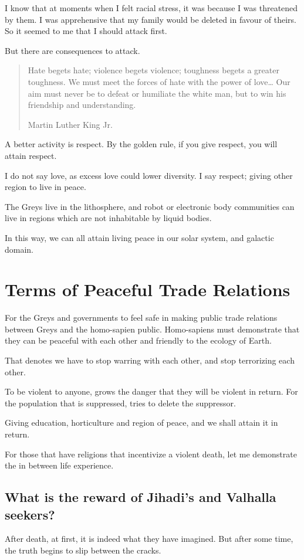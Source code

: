 I know that at moments when I felt racial stress, it was because I was
threatened by them. I was apprehensive that my family would be deleted in favour
of theirs. So it seemed to me that I should attack first. 

But there are consequences to attack.

\blockquote[Martin Luther King Jr.]{Hate begets hate; violence begets violence; 
toughness begets a greater toughness. We must meet the forces of hate with the 
power of love\ldots{} Our aim must never be to defeat or humiliate the white 
man, but to win his friendship and understanding.}

A better activity is respect. By the golden rule, if you give respect, you will
attain respect. 

I do not say love, as excess love could lower diversity. 
I say respect; giving other region to live in peace. 

The Greys live in the lithosphere, and robot or electronic body communities 
can live in regions which are not inhabitable by liquid bodies.

In this way, we can all attain living peace in our solar system, 
and galactic domain.

\section{Terms of Peaceful Trade Relations}\label{terms}

For the Greys and governments to feel safe in making public trade relations
between Greys and the homo-sapien public.
Homo-sapiens must demonstrate that they can be peaceful with each other and
friendly to the ecology of Earth.

That denotes we have to stop warring with each other,
and stop terrorizing each other.

To be violent to anyone, grows the danger that they will be violent in return.
For the population that is suppressed, tries to delete the suppressor. 

Giving education, horticulture and region of peace, and we shall attain it in
return.

For those that have religions that incentivize a violent death, let me
demonstrate the in between life experience.

\subsection{What is the reward of Jihadi's and Valhalla seekers?}
After death, at first, it is indeed what they have imagined. 
But after some time, the truth begins to slip between the cracks. 

